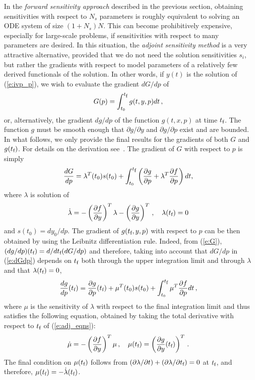In the {\em forward sensitivity approach} described in the previous
section, obtaining sensitivities with respect to $N_s$ parameters is roughly
equivalent to solving an ODE system of size $(1+N_s) N$. This can become 
prohibitively expensive, especially for large-scale problems, if sensitivities
with respect to many parameters are desired.
In this situation, the {\em adjoint sensitivity method} is a very
attractive alternative, provided that we do not need the solution sensitivities
$s_i$, but rather the gradients with respect to model parameters of a relatively 
few derived functionals of the solution. In other words, if $y(t)$ is the solution
of (\ref{e:ivp_p}), we wish to evaluate the gradient ${dG}/{dp}$ of
\begin{equation}\label{e:G}
G(p) = \int_{t_0}^{t_\mb{f}} g(t, y, p) dt \, ,
\end{equation}
or, alternatively, the gradient ${dg}/{dp}$ of the function $g(t, x, p)$ 
at time $t_\mb{f}$. 
The function $g$ must be smooth enough that $\partial g / \partial y$ 
and $\partial g / \partial p$ exist and are bounded. 
In what follows, we only provide the final results for the gradients of both $G$ and 
$g(t_\mb{f})$. For details on the derivation see~\cite{CLPS:03}.
%
The gradient of $G$ with respect to $p$ is simply
\begin{equation}\label{e:dGdp}
  \frac{dG}{dp} = \lambda^T(t_0) s(t_0) + 
  \int_{t_0}^{t_\mb{f}} \left( \frac{\partial g}{\partial p} + 
    \lambda^T \frac{\partial f}{\partial p} \right) dt,
\end{equation}
where $\lambda$ is solution of
\begin{equation}\label{e:adj_eqns}
{\dot \lambda} = -\left( \dfdy \right)^T \lambda - 
\left( \frac{\partial g}{\partial y} \right)^T \, ,
\quad \lambda(t_\mb{f}) = 0
\end{equation}
and $s(t_0) = dy_0/dp$.
%
The gradient of $g(t_\mb{f},y,p)$ with respect to $p$ can be then obtained
by using the Leibnitz differentiation rule. Indeed, from (\ref{e:G}),
$({dg}/{dp})(t_\mb{f}) = {d}/{dt_\mb{f}}({dG}/{dp})$
and therefore, taking into account that $dG/dp$ in (\ref{e:dGdp}) depends on $t_\mb{f}$
both through the upper integration limit and through $\lambda$ and that $\lambda(t_\mb{f}) = 0$, 
\begin{equation}\label{e:dgdp}
  \frac{dg}{dp}(t_\mb{f}) = 
  \frac{\partial g}{\partial p}(t_\mb{f}) +
  \mu^T(t_0) s(t_0) + 
  \int_{t_0}^{t_\mb{f}} \mu^T \frac{\partial f}{\partial p} dt \, ,
\end{equation}
where $\mu$ is the sensitivity of $\lambda$ with respect to the final integration 
limit and thus satisfies the following equation, obtained by taking the total derivative
with respect to $t_\mb{f}$ of (\ref{e:adj_eqns}):
\begin{equation}\label{e:adj1_eqns}
{\dot \mu} = -\left( \dfdy \right)^T \mu \, ,
\quad \mu(t_\mb{f}) = \left( \frac{\partial g}{\partial y}(t_\mb{f}) \right)^T \, .
\end{equation}
The final condition on $\mu(t_\mb{f})$ follows from 
$(\partial\lambda/\partial t) + (\partial\lambda/\partial t_\mb{f}) = 0$ at $t_\mb{f}$, and
therefore, $\mu(t_\mb{f}) = -{\dot\lambda}(t_\mb{f})$. 

